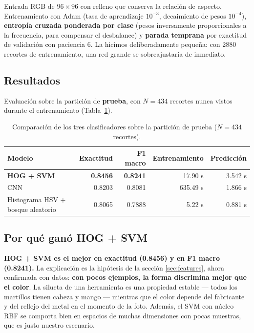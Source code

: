 \documentclass[11pt,a4paper]{article}
\begin{document}
Entrada RGB de $96\times96$ con relleno que conserva la relación de aspecto. Entrenamiento con
Adam (tasa de aprendizaje $10^{-3}$, decaimiento de pesos $10^{-4}$), \textbf{entropía cruzada
ponderada por clase} (pesos inversamente proporcionales a la frecuencia, para compensar el
desbalance) y \textbf{parada temprana} por exactitud de validación con paciencia 6. La hicimos
deliberadamente pequeña: con 2880 recortes de entrenamiento, una red grande se sobreajustaría de
inmediato.

\subsection{Resultados}

Evaluación sobre la partición de \textbf{prueba}, con $N = 434$ recortes nunca vistos durante el
entrenamiento (Tabla~\ref{tab:clasificacion}).

\begin{table}[htbp]
\centering
\caption{Comparación de los tres clasificadores sobre la partición de prueba ($N = 434$ recortes).}
\label{tab:clasificacion}
\small
\begin{tabular}{@{}lrrrr@{}}
\toprule
\textbf{Modelo} & \textbf{Exactitud} & \textbf{F1 macro} & \textbf{Entrenamiento} & \textbf{Predicción} \\
\midrule
\textbf{HOG + SVM}                & \textbf{0.8456} & \textbf{0.8241} &  17.90 s & 3.542 s \\
CNN                               & 0.8203 & 0.8081 & 635.49 s & 1.866 s \\
Histograma HSV + bosque aleatorio & 0.8065 & 0.7888 &   5.22 s & 0.881 s \\
\bottomrule
\end{tabular}
\end{table}

\subsection{Por qué ganó HOG + SVM}

\textbf{HOG + SVM es el mejor en exactitud (0.8456) y en F1 macro (0.8241).} La explicación es la
hipótesis de la sección \ref{sec:features}, ahora confirmada con datos: \textbf{con pocos ejemplos,
la forma discrimina mejor que el color}. La silueta de una herramienta es una propiedad estable
--- todos los martillos tienen cabeza y mango --- mientras que el color depende del fabricante y
del reflejo del metal en el momento de la foto. Además, el SVM con núcleo RBF se comporta bien en
espacios de muchas dimensiones con pocas muestras, que es justo nuestro escenario.
\end{document}
